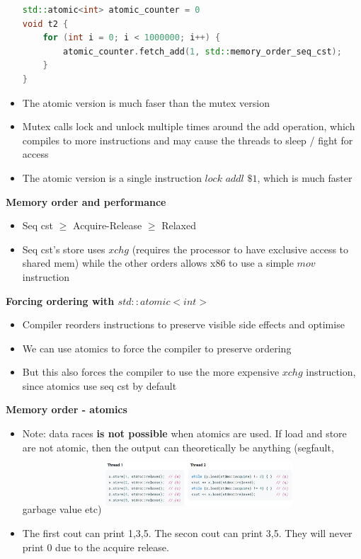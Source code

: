 \documentclass[10pt, landscape]{article}
\begin{document}
\begin{multicols}{4}
\begin{itemize}
\begin{lstlisting}[language=C++, breaklines=true, breakatwhitespace=true]
std::atomic<int> atomic_counter = 0
void t2 {
    for (int i = 0; i < 1000000; i++) {
        atomic_counter.fetch_add(1, std::memory_order_seq_cst);
    }
}
    \end{lstlisting}
    \item The atomic version is much faser than the mutex version
    \item Mutex calls lock and unlock multiple times around the add operation, which compiles to more instructions and may cause the threads to sleep / fight for access
    \item The atomic version is a single instruction $lock$ $addl$ $\$1$, which is much faster
\end{itemize}

\textbf{Memory order and performance} \\ 
\begin{itemize}
    \item Seq cst $\ge$ Acquire-Release $\ge$ Relaxed
    \item Seq cst's store uses $xchg$ (requires the processor to have exclusive access to shared mem) while the other orders allows x86 to use a simple $mov$ instruction
\end{itemize}

\textbf{Forcing ordering with $std::atomic<int>$} \\
\begin{itemize}
    \item Compiler reorders instructions to preserve visible side effects and optimise 
    \item We can use atomics to force the compiler to preserve ordering
    \item But this also forces the compiler to use the more expensive $xchg$ instruction, since atomics use seq cst by default
\end{itemize}

\textbf{Memory order - atomics} \\
\begin{itemize}
    \item Note: data races \textbf{is not possible} when atomics are used. If load and store are not atomic, then the output can theoretically be anything (segfault, garbage value etc)
    \includegraphics*[width=7cm,height=2.2cm]{t2_1.png}
    \item The first cout can print 1,3,5. The secon cout can print 3,5. They will never print 0 due to the acquire release.
\end{itemize}


\end{multicols}
\end{document}
